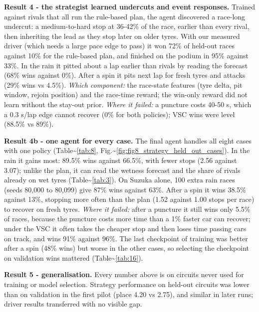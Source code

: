 \documentclass{ieeeaccess}
\begin{document}
\textbf{Result 4 - the strategist learned undercuts and event responses.} Trained
against rivals that all run the rule-based plan, the agent discovered a race-long
undercut: a medium-to-hard stop at 36-42\% of the race, earlier than every rival, then
inheriting the lead as they stop later on older tyres. With our measured driver
(which needs a large pace edge to pass) it won 72\% of held-out races against 10\% for
the rule-based plan, and finished on the podium in 95\% against 33\%. In the rain it
pitted about a lap earlier than rivals by reading the forecast (68\% wins against
0\%). After a spin it pits next lap for fresh tyres and attacks (29\% wins vs 4.5\%).
\emph{Which component:} the race-state features (tyre delta, pit window, rejoin
position) and the race-time reward; the win-only reward did not learn without the
stay-out prior. \emph{Where it failed:} a puncture costs 40-50 s, which a 0.3 s/lap edge
cannot recover (0\% for both policies); VSC wins were level (88.5\% vs 89\%).

\textbf{Result 4b - one agent for every case.} The final agent handles all eight cases
with one policy (Table\textasciitilde{}\ref{tab:8}, Fig.\textasciitilde{}\ref{fig:fig8_strategy_held_out_cases}). In the rain it gains most: 89.5\% wins against
66.5\%, with fewer stops (2.56 against 3.07); unlike the plan, it can read the
wetness forecast and the share of rivals already on wet tyres (Table\textasciitilde{}\ref{tab:3}). On Suzuka
alone, 100 extra rain races (seeds 80,000 to 80,099) give 87\% wins against 63\%.
After a spin it wins 38.5\% against 13\%, stopping more often than the plan (1.52
against 1.00 stops per race) to recover on fresh tyres. \emph{Where it failed:} after a puncture it still
wins only 5.5\% of races, because the puncture costs more time than a 1\% faster car
can recover; under the VSC it often takes the cheaper stop and then loses time
passing cars on track, and wins 91\% against 96\%. The last checkpoint of training
was better after a spin (48\% wins) but worse in the other cases, so selecting the
checkpoint on validation wins mattered (Table\textasciitilde{}\ref{tab:16}).

\textbf{Result 5 - generalisation.} Every number above is on circuits never used for
training or model selection. Strategy performance on held-out circuits was lower
than on validation in the first pilot (place 4.20 vs 2.75), and similar in later
runs; driver results transferred with no visible gap.
\end{document}
